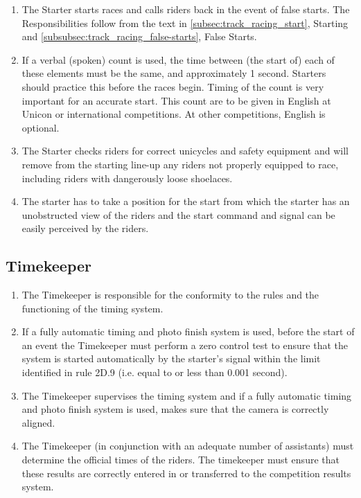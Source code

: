 \begin{enumerate}[leftmargin=1.5em,labelsep=*]
	\item The Starter starts races and calls riders back in the event of false starts. 
    The Responsibilities follow from the text in \ref{subsec:track_racing_start}, 
    Starting and \ref{subsubsec:track_racing_false-starts}, False Starts.
	
	\item If a verbal (spoken) count is used, the time between (the start of) each of these elements 
    must be the same, and approximately 1 second.
	Starters should practice this before the races begin.
	Timing of the count is very important for an accurate start.
	This count are to be given in English at Unicon or international competitions. 
    At other competitions, English is optional.
	
	\item The Starter checks riders for correct unicycles and safety equipment and 
    will remove from the starting line-up any riders not properly equipped to race, 
    including riders with dangerously loose shoelaces.
	
	\item The starter has to take a position for the start from which the starter has an unobstructed view of the 
    riders and the start command and signal can be easily perceived by the riders.
\end{enumerate}

\subsection{Timekeeper}

\begin{enumerate}[leftmargin=1.5em,labelsep=*]
	\item The Timekeeper is responsible for the conformity to the rules and the functioning of the timing system.
	
	\item If a fully automatic timing and photo finish system is used, before the start of an event the Timekeeper
	must perform a zero control test to ensure that the system is started automatically by the starter's signal 
    within the limit identified in rule 2D.9 (i.e. equal to or less than 0.001 second).
	
	\item The Timekeeper supervises the timing system and if a fully automatic timing and photo finish 
    system is used, makes sure that the camera is correctly aligned.
	
	\item The Timekeeper (in conjunction with an adequate number of assistants) must determine the 
    official times of the riders. The timekeeper must ensure that these results are correctly entered 
    in or transferred to the competition results system.
\end{enumerate}

